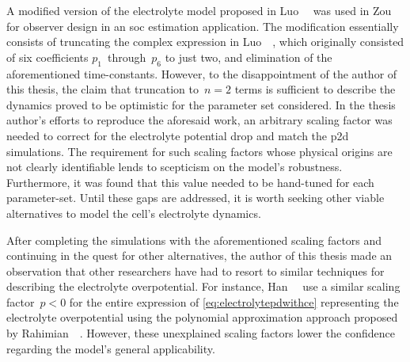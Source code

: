 A modified version of the electrolyte model proposed in Luo~\etal~\cite{Luo2013}
was  used  in Zou~\etal~\cite{Zou2016a}  for  observer  design in  an  \gls{soc}
estimation application. The modification  essentially consists of truncating the
complex expression  in Luo~\etal~\cite{Luo2013},  which originally  consisted of
six  coefficients  $p_1$~through~$p_6$  to  just two,  and  elimination  of  the
aforementioned time-constants. However,  to the disappointment of  the author of
this thesis, the claim that truncation  to~$n=2$ terms is sufficient to describe
the dynamics  proved to be  optimistic for the  parameter set considered.  In
the thesis author's efforts to reproduce  the aforesaid work,  an arbitrary 
scaling factor  was needed  to correct for the electrolyte potential  drop and
match the \gls{p2d} simulations. The requirement for such scaling factors  whose
physical origins are not clearly identifiable lends to scepticism on  the
model's robustness. Furthermore, it was found that  this value  needed to  be
hand-tuned  for each  parameter-set. Until these gaps are addressed, it 
is worth seeking other viable alternatives to model the cell's electrolyte
dynamics.

After  completing  the  simulations  with  the  aforementioned  scaling  factors
and  continuing  in  the  quest  for other  alternatives,  the  author  of  this
thesis  made  an observation  that  other  researchers  have  had to  resort  to
similar techniques  for describing the electrolyte  overpotential. For instance,
Han~\etal~\cite{Han2015a} use  a similar  scaling factor~${p<0}$ for  the entire
expression   of  \cref{eq:electrolytepdwithce}   representing  the   electrolyte
overpotential   using  the   polynomial  approximation   approach  proposed   by
Rahimian~\etal~\cite{KhaleghiRahimian2013}.  However, these  unexplained scaling
factors lower the confidence regarding the model's general applicability.


